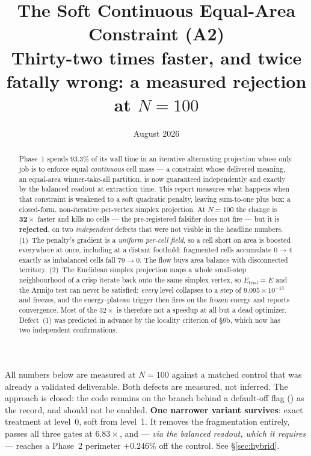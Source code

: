 \documentclass[11pt,a4paper]{article}
\title{\textbf{The Soft Continuous Equal-Area Constraint (A2)}\\[0.5em]
  \large Thirty-two times faster, and twice fatally wrong:
  a measured rejection at $N{=}100$}
\author{}
\date{August 2026}
\begin{document}
\maketitle

\begin{abstract}
Phase~1 spends \(93.3\%\) of its wall time in an iterative alternating
projection whose only job is to enforce equal \emph{continuous} cell mass --- a
constraint whose delivered meaning, an equal-area winner-take-all partition, is
now guaranteed independently and exactly by the balanced readout at extraction
time. This report measures what happens when that constraint is weakened to a
soft quadratic penalty, leaving sum-to-one plus box: a closed-form, non-iterative
per-vertex simplex projection. At \(N{=}100\) the change is \(\mathbf{32\times}\)
faster and kills no cells --- the pre-registered falsifier does not fire ---
but it is \textbf{rejected}, on two \emph{independent} defects that were not
visible in the headline numbers. (1)~The penalty's gradient is a \emph{uniform
per-cell field}, so a cell short on area is boosted everywhere at once, including
at a distant foothold: fragmented cells accumulate \(0\to4\) exactly as
imbalanced cells fall \(79\to0\). The flow buys area balance with disconnected
territory. (2)~The Euclidean simplex projection maps a whole small-step
neighbourhood of a crisp iterate back onto the same simplex vertex, so
\(E_{\text{trial}}=E\) and the Armijo test can never be satisfied: \emph{every}
level collapses to a step of \(9.095\times10^{-13}\) and freezes, and the
energy-plateau trigger then fires on the frozen energy and reports convergence.
Most of the \(32\times\) is therefore not a speedup at all but a dead optimizer.
Defect~(1) was predicted in advance by the locality criterion of
 \S9b, which now has
two independent confirmations.
\end{abstract}

\begin{tcolorbox}[colback=red!5!white, colframe=red!60!black,
                  title={Status --- measured; verdict REJECTED},
                  fontupper=\small]
All numbers below are measured at \(N{=}100\) against a matched control that was
already a validated deliverable. Both defects are measured, not inferred. The
approach is closed: the code remains on the branch behind a default-off flag
() as the record, and should not be enabled.
\textbf{One narrower variant survives}: exact treatment at level~0, soft from
level~1. It removes the fragmentation entirely, passes all three gates at
\(6.83\times\), and --- \emph{via the balanced readout, which it requires} ---
reaches a Phase~2 perimeter \(+0.246\%\) off the control. See
\S\ref{sec:hybrid}.
\end{tcolorbox}
\end{document}
